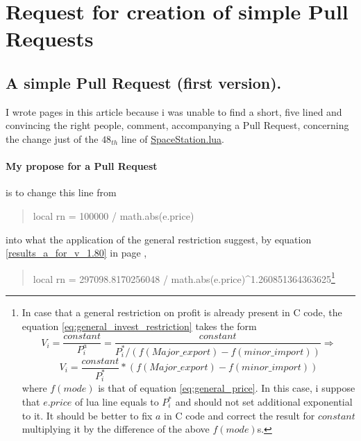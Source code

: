 \documentclass[]{article}
\begin{document}
\label{pages_for_48_lua_line}
\section{Request for creation of simple Pull Requests}

\subsection{A simple Pull Request (first version).}
I wrote  pages in this article because i was unable to find a short, five lined and convincing the right people, comment, accompanying a Pull Request, concerning the change just of the $48_{th}$ line of \hyperref{https://github.com/pioneerspacesim/pioneer/blob/25bc005c67a43eb2c17fcb83fe20f5d07a6b394c/data/libs/SpaceStation.lua#L48}{}{}{SpaceStation.lua}.
\paragraph{My propose for a Pull Request} is to change this line from
\begin{quote}
	local rn = 100000 / math.abs(e.price)
\end{quote}
into what the application of the general restriction suggest, by equation \eqref{results_a_for_v_1.80} in page \pageref{results_a_for_v_1.80},
\begin{quote}
	local rn = 297098.8170256048 / math.abs(e.price)\textasciicircum1.260851364363625\footnote{In case that a general restriction on profit is already present in C code, the equation \eqref{eq:general_invest_restriction} takes the form \[V_{i}=\dfrac{constant}{P^{a}_{i}}=\dfrac{constant}{P^{*}_{i}/(f(Major\_export)-f(minor\_import))}\Rightarrow\]\[V_{i}=\dfrac{constant}{P^{*}_{i}}*(f(Major\_export)-f(minor\_import))\] where $f(mode)$ is that of equation \eqref{eq:general_price}. In this case, i suppose that $e.price$ of lua line equals to $P^{*}_{i}$ and should not set additional exponential to it. It should be better to fix $a$ in C code and correct the result for $constant$ multiplying it by the difference of the above $f(mode)$s.}
\end{quote}
\end{document}
